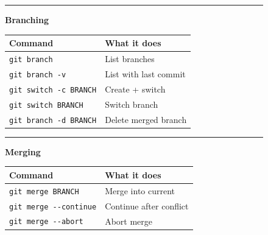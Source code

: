 \documentclass[
  9pt,
  a4paper,
  DIV=11,
  numbers=noendperiod]{scrartcl}
\begin{document}
\begin{figure}
\begin{minipage}{0.50\linewidth}
\end{minipage}%
\newline
\begin{minipage}{0.50\linewidth}

\begin{center}\rule{0.5\linewidth}{0.5pt}\end{center}

\end{minipage}%
%
\begin{minipage}{0.50\linewidth}
\textbf{Branching}\end{minipage}%
\newline
\begin{minipage}{0.50\linewidth}

\begin{longtable}[]{@{}ll@{}}
\toprule\noalign{}
Command & What it does \\
\midrule\noalign{}
\endhead
\bottomrule\noalign{}
\endlastfoot
\texttt{git\ branch} & List branches \\
\texttt{git\ branch\ -v} & List with last commit \\
\texttt{git\ switch\ -c\ BRANCH} & Create + switch \\
\texttt{git\ switch\ BRANCH} & Switch branch \\
\texttt{git\ branch\ -d\ BRANCH} & Delete merged branch \\
\end{longtable}

\end{minipage}%
%
\begin{minipage}{0.50\linewidth}

\begin{center}\rule{0.5\linewidth}{0.5pt}\end{center}

\end{minipage}%
\newline
\begin{minipage}{0.50\linewidth}
\textbf{Merging}\end{minipage}%
%
\begin{minipage}{0.50\linewidth}

\begin{longtable}[]{@{}ll@{}}
\toprule\noalign{}
Command & What it does \\
\midrule\noalign{}
\endhead
\bottomrule\noalign{}
\endlastfoot
\texttt{git\ merge\ BRANCH} & Merge into current \\
\texttt{git\ merge\ -\/-continue} & Continue after conflict \\
\texttt{git\ merge\ -\/-abort} & Abort merge \\
\end{longtable}


\end{minipage}
\end{figure}
\end{document}
